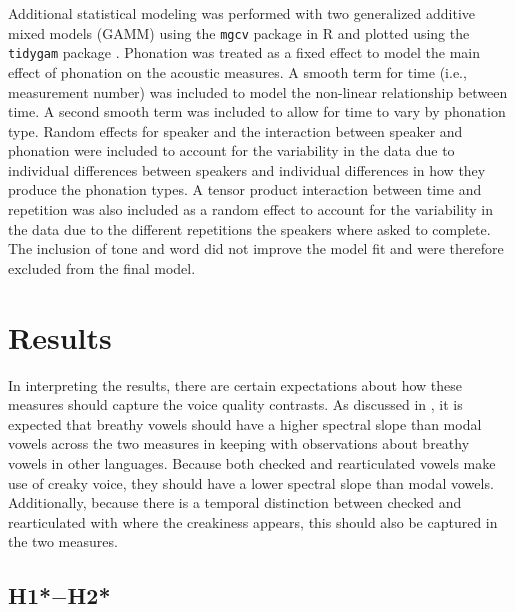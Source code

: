 Additional statistical modeling was performed with two generalized additive mixed models (GAMM) using the \texttt{mgcv} package in R \citep{woodGeneralizedAdditiveModels2017} and plotted using the \texttt{tidygam} package \citep{corettaTidygamTidyPrediction2024}. Phonation was treated as a fixed effect to model the main effect of phonation on the acoustic measures. A smooth term for time (i.e., measurement number)  was included to model the non-linear relationship between time. A second smooth term was included to allow for time to vary by phonation type. Random effects for speaker and the interaction between speaker and phonation were included to account for the variability in the data due to individual differences between speakers and individual differences in how they produce the phonation types. A tensor product interaction between time and repetition was also included as a random effect to account for the variability in the data due to the different repetitions the speakers where asked to complete. The inclusion of tone and word did not improve the model fit and were therefore excluded from the final model.
\section{Results} \label{sec:Results}

In interpreting the results, there are certain expectations about how these measures should capture the voice quality contrasts. As discussed in \citet{garellekPhoneticsVoice2019}, it is expected that breathy vowels should have a higher spectral slope than modal vowels across the two measures in keeping with observations about breathy vowels in other languages. Because both checked and rearticulated vowels make use of creaky voice, they should have a lower spectral slope than modal vowels. Additionally, because there is a temporal distinction between checked and rearticulated with where the creakiness appears, this should also be captured in the two measures. 

\subsection{\texorpdfstring{H1*$-$H2*}{H1*-H2*}} \label{sec:H1H2}

